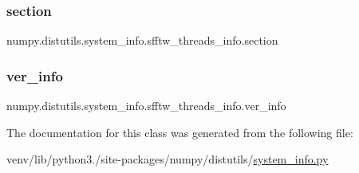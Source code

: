 \subsubsection{\texorpdfstring{section}{section}}
{\footnotesize\ttfamily numpy.\+distutils.\+system\+\_\+info.\+sfftw\+\_\+threads\+\_\+info.\+section\hspace{0.3cm}{\ttfamily [static]}}

\mbox{\label{classnumpy_1_1distutils_1_1system__info_1_1sfftw__threads__info_a05f5d2d1d9163d5e8f9e183762e77e0e}} 
\subsubsection{\texorpdfstring{ver\+\_\+info}{ver\_info}}
{\footnotesize\ttfamily numpy.\+distutils.\+system\+\_\+info.\+sfftw\+\_\+threads\+\_\+info.\+ver\+\_\+info\hspace{0.3cm}{\ttfamily [static]}}



The documentation for this class was generated from the following file\+:\begin{DoxyCompactItemize}
\item 
venv/lib/python3./site-\/packages/numpy/distutils/\hyperlink{system__info_8py}{system\+\_\+info.\+py}\end{DoxyCompactItemize}

